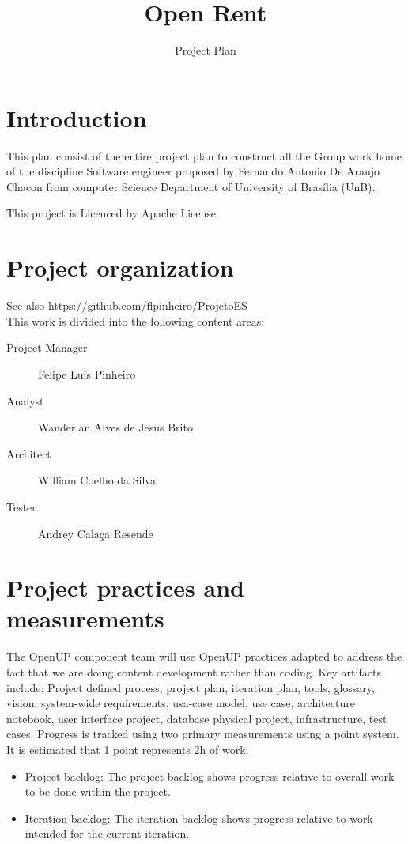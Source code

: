 \documentclass[a4paper]{article}%
\begin{document}
\title{Open Rent}
\author{Project Plan}
\date{}
\maketitle

\section{Introduction}

This plan consist of the entire project plan to construct all the Group work home of the  discipline Software engineer proposed by Fernando Antonio De Araujo Chacon from computer Science Department of University of Brasília (UnB).

This project is Licenced by Apache License.

\section{Project organization}

See also https://github.com/flpinheiro/ProjetoES \\
This work is divided into the following content areas:\\
\begin{description}
	\item[Project Manager] Felipe Luís Pinheiro
	\item[Analyst] Wanderlan Alves de Jesus Brito
	\item[Architect] William Coelho da Silva
	\item[Tester] Andrey Calaça Resende
\end{description}

\section{Project practices and measurements}

The OpenUP component team will use OpenUP practices adapted to address the fact that we are doing content development rather than coding. Key artifacts include: Project defined process, project plan, iteration plan, tools, glossary, vision, system-wide requirements, usa-case model, use case, architecture notebook, user interface  project, database physical project, infrastructure, test cases.
Progress is tracked using two primary measurements using a point system. It is estimated that 1 point represents 2h of work:
\begin{itemize}
	\item Project backlog: The project backlog shows progress relative to overall work to be done within the project.
	\item Iteration backlog: The iteration backlog shows progress relative to work intended for the current iteration.
\end{itemize}
\end{document}
